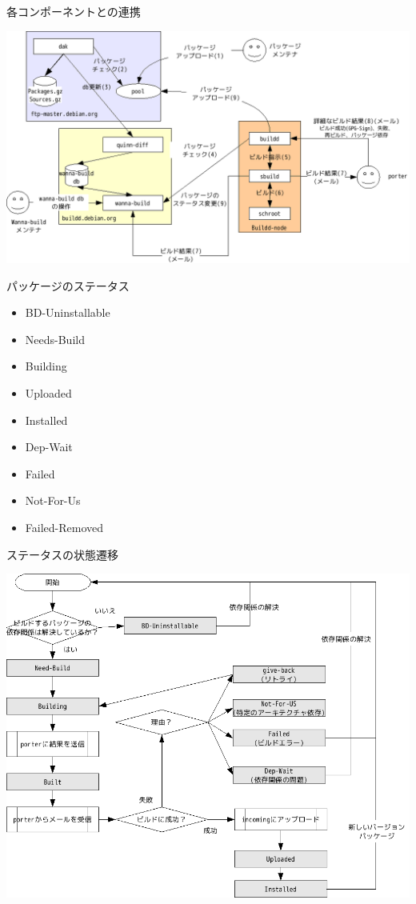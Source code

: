 \begin{frame}{各コンポーネントとの連携}
\begin{center}
\includegraphics[width=1.1\hsize]{image200911/buildd-image00.png}
\end{center}
\end{frame}

\begin{frame}{パッケージのステータス}
\begin{itemize}
\item BD-Uninstallable
\item Needs-Build 
\item Building 
\item Uploaded
\item Installed
\item Dep-Wait
\item Failed
\item Not-For-Us
\item Failed-Removed
\end{itemize}
\end{frame}

\begin{frame}{ステータスの状態遷移}
\begin{center}
\includegraphics[width=0.9\hsize]{image200911/buildd-status.png}
\end{center}
\end{frame}

